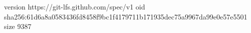 version https://git-lfs.github.com/spec/v1
oid sha256:61d6a8a0583436fd8458f9bc1f4179711b171935dec75a9967da99e0e57e5501
size 9387
